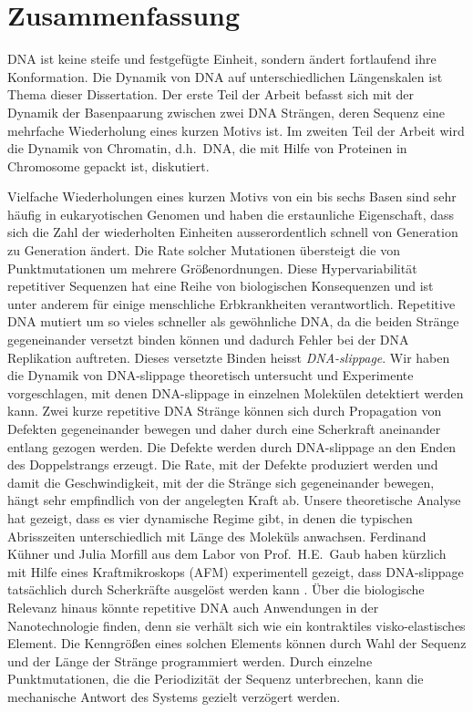 \chapter*{Zusammenfassung}

DNA ist keine steife und festgef\"ugte Einheit, sondern \"andert fortlaufend ihre Konformation. Die Dynamik
von DNA auf unterschiedlichen L\"angenskalen ist Thema dieser Dissertation. 
Der erste Teil der Arbeit befasst sich mit der Dynamik der Basenpaarung zwischen 
zwei DNA Str\"angen, deren Sequenz eine mehrfache Wiederholung eines kurzen Motivs ist. 
Im zweiten Teil der Arbeit wird die Dynamik von Chromatin, d.h.~DNA, die mit Hilfe von Proteinen
in Chromosome gepackt ist, diskutiert. 

Vielfache Wiederholungen eines kurzen Motivs von ein bis sechs Basen sind sehr
h\"aufig in eukaryotischen Genomen und haben die erstaunliche Eigenschaft, dass sich die Zahl der wiederholten Einheiten
ausserordentlich schnell von Generation zu Generation \"andert. Die Rate solcher Mutationen 
\"ubersteigt die von Punktmutationen um mehrere Gr\"o\ss{}enordnun\-gen. 
Diese Hypervariabilit\"at repetitiver Sequenzen hat eine Reihe 
von biologischen Konsequenzen und ist  unter anderem f\"ur einige menschliche Erbkrankheiten verantwortlich. 
Repetitive DNA mutiert um so vieles schneller als gew\"ohnliche DNA, da die beiden Str\"ange
gegeneinander versetzt binden k\"onnen und dadurch Fehler bei der DNA Replikation auf\-treten.   
Dieses versetzte Binden heisst \emph{DNA-slippage}. Wir haben die
Dynamik von DNA-slippage theoretisch untersucht und Experimente vorgeschlagen, mit denen  
DNA-slippage in einzelnen Molek\"ulen detektiert werden kann. 
Zwei kurze repetitive DNA Str\"ange k\"onnen sich durch Propagation von Defekten
gegeneinander bewegen und daher durch eine Scher\-kraft aneinander entlang gezogen werden. 
Die Defekte werden durch DNA-slippage an den Enden des Doppelstrangs erzeugt. 
Die Rate, mit der Defekte produziert werden und damit die Geschwindigkeit, mit der die Str\"ange
sich gegeneinander bewegen, h\"angt sehr empfindlich von der angelegten Kraft ab. 
Unsere theoretische Analyse hat gezeigt, dass
es vier dynamische Regime gibt, in denen die typischen Abrisszeiten unterschiedlich mit 
L\"ange des Molek\"uls anwachsen. Ferdinand K\"uhner und Julia Morfill aus dem Labor von 
Prof.~H.E.~Gaub haben k\"urzlich mit Hilfe eines Kraftmikroskops (AFM) experimentell gezeigt, 
dass DNA-slippage tats\"achlich 
durch Scherkr\"afte ausgel\"ost werden kann \cite{Kuehner_BiophysJ_07}. 
\"Uber die biologische Relevanz hinaus k\"onnte repetitive DNA auch Anwendungen in der Nanotechnologie 
finden, denn sie verh\"alt sich wie ein kontraktiles visko-elastisches Element. Die Kenngr\"o\ss{}en
eines solchen Elements k\"onnen durch Wahl der Sequenz und der L\"ange der Str\"ange 
programmiert werden. Durch einzelne Punktmutationen, die die Periodizit\"at der Sequenz unterbrechen, 
kann die mechanische Antwort des Systems gezielt verz\"ogert werden.


